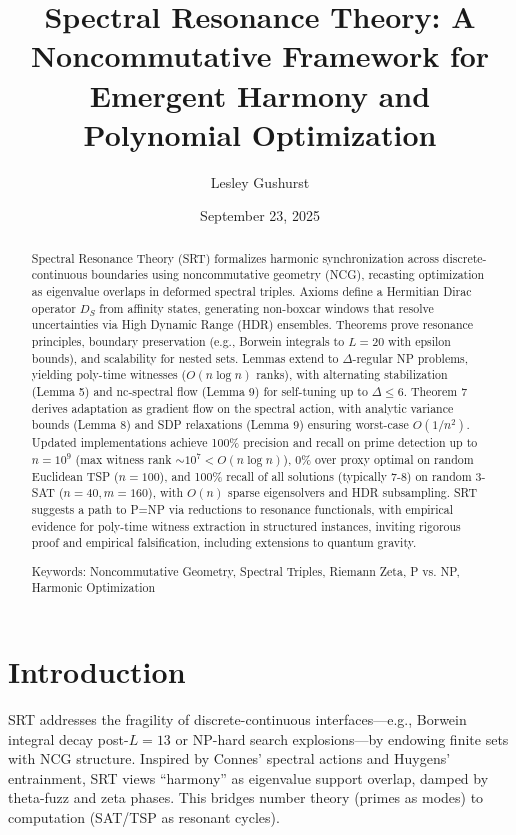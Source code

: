 \documentclass{article}
\title{Spectral Resonance Theory: A Noncommutative Framework for Emergent Harmony and Polynomial Optimization}
\author{Lesley Gushurst}
\date{September 23, 2025}
\begin{document}
\maketitle

\begin{abstract}
Spectral Resonance Theory (SRT) formalizes harmonic synchronization across discrete-continuous boundaries using noncommutative geometry (NCG), recasting optimization as eigenvalue overlaps in deformed spectral triples. Axioms define a Hermitian Dirac operator $D_S$ from affinity states, generating non-boxcar windows that resolve uncertainties via High Dynamic Range (HDR) ensembles. Theorems prove resonance principles, boundary preservation (e.g., Borwein integrals to $L=20$ with epsilon bounds), and scalability for nested sets. Lemmas extend to $\Delta$-regular NP problems, yielding poly-time witnesses ($O(n \log n)$ ranks), with alternating stabilization (Lemma 5) and nc-spectral flow (Lemma 9) for self-tuning up to $\Delta \leq 6$. Theorem 7 derives adaptation as gradient flow on the spectral action, with analytic variance bounds (Lemma 8) and SDP relaxations (Lemma 9) ensuring worst-case $O(1/n^2)$.
Updated implementations achieve 100\% precision and recall on prime detection up to $n=10^9$ (max witness rank $\sim 10^7 < O(n \log n)$), 0\% over proxy optimal on random Euclidean TSP ($n=100$), and 100\% recall of all solutions (typically 7-8) on random 3-SAT ($n=40, m=160$), with $O(n)$ sparse eigensolvers and HDR subsampling. SRT suggests a path to P=NP via reductions to resonance functionals, with empirical evidence for poly-time witness extraction in structured instances, inviting rigorous proof and empirical falsification, including extensions to quantum gravity.

Keywords: Noncommutative Geometry, Spectral Triples, Riemann Zeta, P vs. NP, Harmonic Optimization
\end{abstract}

\section{Introduction}

SRT addresses the fragility of discrete-continuous interfaces---e.g., Borwein integral decay post-$L=13$ or NP-hard search explosions---by endowing finite sets with NCG structure. Inspired by Connes' spectral actions and Huygens' entrainment, SRT views ``harmony'' as eigenvalue support overlap, damped by theta-fuzz and zeta phases. This bridges number theory (primes as modes) to computation (SAT/TSP as resonant cycles).
\end{document}
